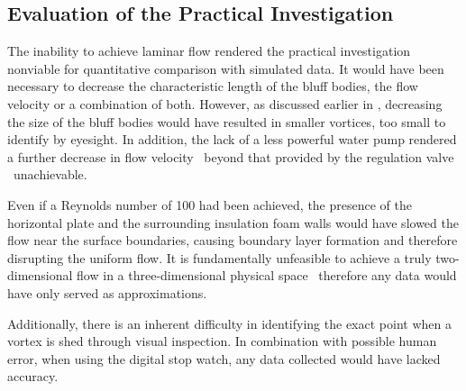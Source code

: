 \subsection{Evaluation of the Practical Investigation}
The inability to achieve laminar flow rendered the practical investigation nonviable for quantitative comparison with simulated data. It would have been necessary to decrease the characteristic length of the bluff bodies, the flow velocity or a combination of both. However, as discussed earlier in , decreasing the size of the bluff bodies would have resulted in smaller vortices, too small to identify by eyesight. In addition, the lack of a less powerful water pump rendered a further decrease in flow velocity \textemdash\ beyond that provided by the regulation valve \textemdash\ unachievable.

Even if a Reynolds number of 100 had been achieved, the presence of the horizontal plate and the surrounding insulation foam walls would have slowed the flow near the surface boundaries, causing boundary layer formation and therefore disrupting the uniform flow. It is fundamentally unfeasible to achieve a truly two-dimensional flow in a three-dimensional physical space \textemdash\ therefore any data would have only served as approximations. 

Additionally, there is an inherent difficulty in identifying the exact point when a vortex is shed through visual inspection. In combination with possible human error, when using the digital stop watch, any data collected would have lacked accuracy.

